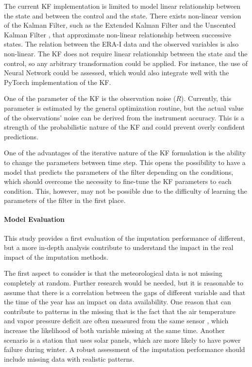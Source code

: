 \documentclass{article}
\begin{document}
The current KF implementation is limited to model linear relationship between the state and between the control and the state. There exists non-linear version of the Kalman Filter, such as the Extended Kalman Filter and the Unscented Kalman Filter \cite{dan_simon_optimal_2006}, that approximate non-linear relationship between successive states.
The relation between the ERA-I data and the observed variables is also non-linear\cite{vuichard_filling_2015}. The KF does not require linear relationship between the state and the control, so any arbitrary transformation could be applied. For instance, the use of Neural Network could be assessed, which would also integrate well with the \textsf{PyTorch} implementation of the KF.

One of the parameter of the KF is the observation noise ($R$). Currently, this parameter is estimated by the general optimization routine, but the actual value of the observations' noise can be derived from the instrument accuracy. This is a strength of the probabilistic nature of the KF and could prevent overly confident predictions. 

One of the advantages of the iterative nature of the KF formulation is the ability to change the parameters between time step.  This opens the possibility to have a model that predicts the parameters of the filter depending on the conditions, which should overcome the necessity to fine-tune the KF parameters to each condition. This, however, may not be possible due to the difficulty of learning the parameters of the filter in the first place.

\paragraph{Model Evaluation} This study provides a first evaluation of the imputation performance of different, but a more in-depth analysis contribute to understand the impact in the real impact of the imputation methods.

The first aspect to consider is that the meteorological data is not missing completely at random. Further research would be needed, but it is reasonable to assume that there is a correlation between the gaps of different variable and that the time of the year has an impact on data availability. One reason that can contribute to patterns in the missing that is the fact that the air temperature and vapor pressure deficit are often measured from the same sensor \cite{noauthor_associated_2020, noauthor_specification_nodate}, which increase the likelihood of both variable missing at the same time. Another scenario is a station that uses solar panels, which are more likely to have power failure during winter. A robust assessment of the imputation performance should include missing data with realistic patterns.
\end{document}
